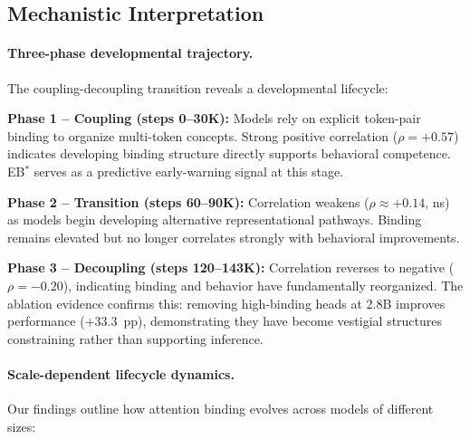 \documentclass[10pt]{article} %
\begin{document}
\subsection{Mechanistic Interpretation}

\paragraph{Three-phase developmental trajectory.}
The coupling-decoupling transition reveals a developmental lifecycle:

\textbf{Phase 1 -- Coupling (steps 0--30K):} Models rely on explicit token-pair binding to organize multi-token concepts. Strong positive correlation ($\rho=+0.57$) indicates developing binding structure directly supports behavioral competence. EB$^*$ serves as a predictive early-warning signal at this stage.

\textbf{Phase 2 -- Transition (steps 60--90K):} Correlation weakens ($\rho\approx+0.14$, ns) as models begin developing alternative representational pathways. Binding remains elevated but no longer correlates strongly with behavioral improvements.

\textbf{Phase 3 -- Decoupling (steps 120--143K):} Correlation reverses to negative ($\rho=-0.20$), indicating binding and behavior have fundamentally reorganized. The ablation evidence confirms this: removing high-binding heads at 2.8B improves performance ($+33.3$~pp), demonstrating they have become vestigial structures constraining rather than supporting inference.

\paragraph{Scale-dependent lifecycle dynamics.}
Our findings outline how attention binding evolves across models of different sizes:
\end{document}
